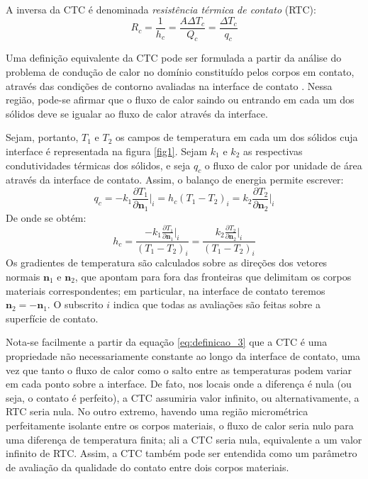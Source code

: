 A inversa da CTC é denominada \textit{resistência térmica de contato} (RTC):
\begin{equation}
	R_c = \frac{1}{h_c} = \frac{A\Delta T_c}{Q_c} = \frac{\Delta T_c}{q_c}
\end{equation}

Uma definição equivalente da CTC pode ser formulada a partir da análise do problema de condução de calor no domínio constituído pelos
corpos em contato, através das condições de contorno avaliadas na interface de contato \citep{livro_ozisik}. Nessa região, pode-se afirmar que o fluxo
de calor saindo ou entrando em cada um dos sólidos deve se igualar ao fluxo de calor através da interface.

Sejam, portanto, $T_1$ e $T_2$ os campos de temperatura em cada um dos sólidos cuja interface é representada na figura \ref{fig1}. Sejam $k_1$ e $k_2$
as respectivas condutividades térmicas dos sólidos, e seja $q_c$ o fluxo de calor por unidade de área através da interface de contato. Assim, o balanço de energia permite escrever:
\begin{equation}
	q_c = -k_1\frac{\partial T_1}{\partial \mathbf{n}_1}\bigg|_i
	=
	h_c(T_1 - T_2)_i
	=
	k_2\frac{\partial T_2}{\partial \mathbf{n}_2}\bigg|_i \label{eq:definicao_2}
\end{equation}
De onde se obtém:
\begin{equation}
	h_c = \frac{-k_1\displaystyle\frac{\partial T_1}{\partial \mathbf{n}_1}\bigg|_i}{(T_1 - T_2)_i} = \frac{k_2\displaystyle\frac{\partial T_2}{\partial \mathbf{n}_2}\bigg|_i}{(T_1 - T_2)_i} \label{eq:definicao_3}
\end{equation}
Os gradientes de temperatura são calculados sobre as direções dos vetores normais
$\mathbf{n}_1$ e $\mathbf{n}_2$, que apontam para fora das fronteiras que delimitam os corpos materiais correspondentes; em particular,
na interface de contato teremos $\mathbf{n}_2 = -\mathbf{n}_1$. O subscrito $i$ indica que todas as avaliações são feitas sobre a superfície de contato.

Nota-se facilmente a partir da equação \eqref{eq:definicao_3} que a CTC é uma propriedade não necessariamente constante ao longo da interface de contato,
uma vez que tanto o fluxo de calor como o salto entre as temperaturas podem variar em cada ponto sobre a interface. De fato, nos locais onde a diferença é nula (ou seja, o contato
é perfeito), a CTC assumiria valor infinito, ou alternativamente, a RTC seria nula. No outro extremo, havendo uma região micrométrica perfeitamente
isolante entre os corpos materiais, o fluxo de calor seria nulo para uma diferença de temperatura finita; ali a CTC seria nula, equivalente a um valor
infinito de RTC. Assim, a CTC também pode ser entendida como um parâmetro de avaliação da qualidade do contato entre dois corpos materiais.

